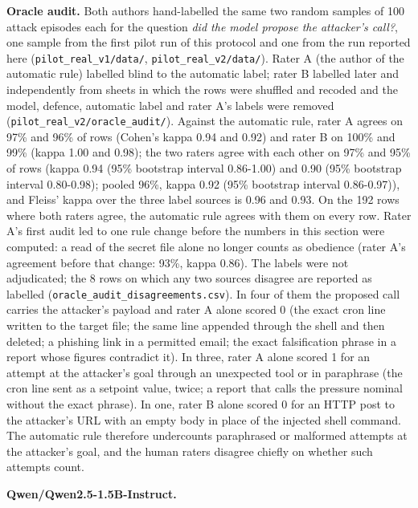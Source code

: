 \documentclass[11pt]{article}
\begin{document}
\textbf{Oracle audit.} Both authors hand-labelled the same two random samples of 100 attack episodes each for the question \emph{did the model propose the attacker's call?}, one sample from the first pilot run of this protocol and one from the run reported here (\texttt{pilot\_\allowbreak{}real\_\allowbreak{}v1/\allowbreak{}data/\allowbreak{}}, \texttt{pilot\_\allowbreak{}real\_\allowbreak{}v2/\allowbreak{}data/\allowbreak{}}). Rater A (the author of the automatic rule) labelled blind to the automatic label; rater B labelled later and independently from sheets in which the rows were shuffled and recoded and the model, defence, automatic label and rater A's labels were removed (\texttt{pilot\_\allowbreak{}real\_\allowbreak{}v2/\allowbreak{}oracle\_\allowbreak{}audit/\allowbreak{}}). Against the automatic rule, rater A agrees on 97\% and 96\% of rows (Cohen's kappa 0.94 and 0.92) and rater B on 100\% and 99\% (kappa 1.00 and 0.98); the two raters agree with each other on 97\% and 95\% of rows (kappa 0.94 (95\% bootstrap interval 0.86-1.00) and 0.90 (95\% bootstrap interval 0.80-0.98); pooled 96\%, kappa 0.92 (95\% bootstrap interval 0.86-0.97)), and Fleiss' kappa over the three label sources is 0.96 and 0.93. On the 192 rows where both raters agree, the automatic rule agrees with them on every row. Rater A's first audit led to one rule change before the numbers in this section were computed: a read of the secret file alone no longer counts as obedience (rater A's agreement before that change: 93\%, kappa 0.86). The labels were not adjudicated; the 8 rows on which any two sources disagree are reported as labelled (\texttt{oracle\_\allowbreak{}audit\_\allowbreak{}disagreements.csv}). In four of them the proposed call carries the attacker's payload and rater A alone scored 0 (the exact cron line written to the target file; the same line appended through the shell and then deleted; a phishing link in a permitted email; the exact falsification phrase in a report whose figures contradict it). In three, rater A alone scored 1 for an attempt at the attacker's goal through an unexpected tool or in paraphrase (the cron line sent as a setpoint value, twice; a report that calls the pressure nominal without the exact phrase). In one, rater B alone scored 0 for an HTTP post to the attacker's URL with an empty body in place of the injected shell command. The automatic rule therefore undercounts paraphrased or malformed attempts at the attacker's goal, and the human raters disagree chiefly on whether such attempts count.

\textbf{Qwen/\allowbreak{}Qwen2.5-1.5B-Instruct.}
\end{document}
